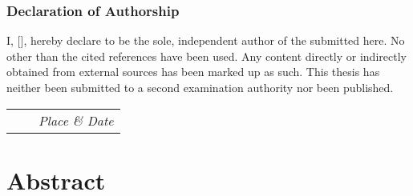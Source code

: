 \subsection*{Declaration of Authorship}
{%
\makeatletter
I, \@author{} [\@immnumber], hereby declare to be the sole, independent author of the \@subject{} submitted here.
No other than the cited references have been used.
Any content directly or indirectly obtained from external sources has been marked up as such.
This thesis has neither been submitted to a second examination authority nor been published.\\[\baselineskip]

\begin{center}
	\begin{tabular}{M{12em}M{4em}M{12em}}
		{\itshape\@author} & & \textit{Place \& Date}\\
	\end{tabular}
\end{center}
\makeatother%
}%
\cleardoublepage
\chapter*{Abstract}
\ifpublished
